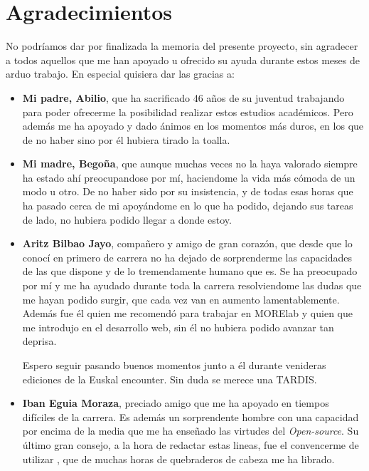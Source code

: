 \chapter*{Agradecimientos}

No podríamos dar por finalizada la memoria del presente proyecto, sin agradecer a todos aquellos que me han apoyado u ofrecido su ayuda durante estos meses de arduo trabajo.
En especial quisiera dar las gracias a: 

\begin{itemize}
	\item \textbf{Mi padre, Abilio}, que ha sacrificado 46 años de su juventud trabajando para poder ofrecerme la posibilidad realizar estos estudios académicos. Pero además me ha apoyado y dado ánimos en los momentos más duros, en los que de no haber sino por él hubiera tirado la toalla.

	\item \textbf{Mi madre, Begoña}, que aunque muchas veces no la haya valorado siempre ha estado ahí preocupandose por mí, haciendome la vida más cómoda de un modo u otro. De no haber sido por su insistencia, y de todas esas horas que ha pasado cerca de mi apoyándome en lo que ha podido, dejando sus tareas de lado, no hubiera podido llegar a donde estoy.

	\item \textbf{Aritz Bilbao Jayo}, compañero y amigo de gran corazón, que desde que lo conocí en primero de carrera no ha dejado de sorprenderme las capacidades de las que dispone y de lo tremendamente humano que es. Se ha preocupado por mí y me ha ayudado durante toda la carrera resolviendome las dudas que me hayan podido surgir, que cada vez van en aumento lamentablemente. 
	Además fue él quien me recomendó para trabajar en MORElab y quien que me introdujo en el desarrollo web, sin él no hubiera podido avanzar tan deprisa.
	
	Espero seguir pasando buenos momentos junto a él durante venideras ediciones de la Euskal encounter. Sin duda se merece una TARDIS.

	\item \textbf{Iban Eguia Moraza}, preciado amigo que me ha apoyado en tiempos difíciles de la carrera. Es además un sorprendente hombre con una capacidad por encima de la media que me ha enseñado las virtudes del \textit{Open-source}. Su último gran consejo, a la hora de redactar estas lineas, fue el convencerme de utilizar , que de muchas horas de quebraderos de cabeza me ha librado.
	

\end{itemize}
